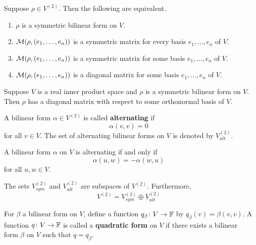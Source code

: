 \documentclass{extarticle}
\begin{document}
\begin{thm}
    Suppose \(\rho \in V^{(2)}\). Then the following are equivalent. 

    \begin{enumerate}[label=(\alph*)]
        \item \(\rho\) is a symmetric bilinear form on \(V\). 
        \item \(\mathcal{M}(\rho, (e_1, \ldots, e_n))\) is a symmetric matrix for every basis \(e_1, \ldots, e_n\) of \(V\). 
        \item \(\mathcal{M}(\rho, (e_1, \ldots, e_n))\) is a symmetric matrix for some basis \(e_1, \ldots, e_n\) of \(V\). 
        \item \(\mathcal{M}(\rho, (e_1, \ldots, e_n))\) is a diagonal matrix for some basis \(e_1, \ldots, e_n\) of \(V\).
    \end{enumerate}
\end{thm}

\begin{thm}
    Suppose \(V\) is a real inner product space and \(\rho\) is a symmetric bilinear form on \(V\). Then 
    \(\rho\) has a diagonal matrix with respect to some orthonormal basis of \(V\).
\end{thm}

\begin{definition}
    A bilinear form \(\alpha \in V^{(2)}\) is called \textbf{alternating} if 
    \[\alpha(v, v) = 0\]
    for all \(v \in V\). The set of alternating bilinear forms on \(V\) is denoted by \(V_{alt}^{(2)}\).
\end{definition}

\begin{lemma}
    A bilinear form \(\alpha\) on \(V\) is alternating if and only if 
    \[\alpha(u, w) = -\alpha(w, u)\]
    for all \(u, w \in V\).
\end{lemma}

\begin{thm}
    The sets \(V_{sym}^{(2)}\) and \(V_{alt}^{(2)}\) are subspaces of \(V^{(2)}\). Furthermore, 
    \[V^{(2)} = V_{sym}^{(2)} \oplus V_{alt}^{(2)}\]
\end{thm}

\begin{definition}
    For \(\beta\) a bilinear form on \(V\), define a function \(q_\beta \colon V \to \mathbb{F}\) by 
    \(q_\beta (v) =\beta(v, v)\). A function \(q \colon V \to \mathbb{F}\) is called a \textbf{quadratic form} 
    on \(V\) if there exists a bilinear form \(\beta\) on \(V\) such that \(q = q_\beta\).
\end{definition}
\end{document}
